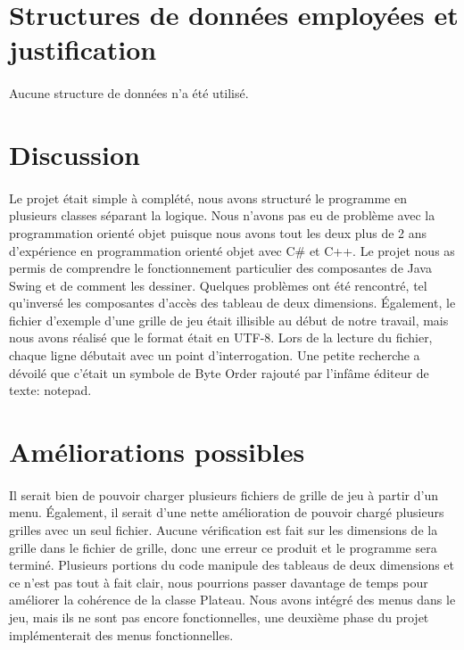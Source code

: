 \documentclass[11pt, french]{article} %
\begin{document}
\section{Structures de données employées et justification}
\paragraph{}
Aucune structure de données n'a été utilisé.


\section{Discussion}
\paragraph{}
Le projet était simple à complété, nous avons structuré le programme en plusieurs classes  séparant la logique. Nous n'avons pas eu de problème avec la programmation orienté objet puisque nous avons tout les deux plus de 2 ans d'expérience en programmation orienté objet avec C\# et C++. Le projet nous as permis de comprendre le fonctionnement particulier des composantes de Java Swing et de comment les dessiner. Quelques problèmes ont été rencontré, tel qu'inversé les composantes d'accès des tableau de deux dimensions. Également, le fichier d'exemple d'une grille de jeu était illisible au début de notre travail, mais nous avons réalisé que le format était en UTF-8. Lors de la lecture du fichier, chaque ligne débutait avec un point d'interrogation. Une petite recherche a dévoilé que c'était un symbole de Byte Order rajouté par l'infâme éditeur de texte: notepad.



\section{Améliorations possibles}
\paragraph{}
Il serait bien de pouvoir charger plusieurs fichiers de grille de jeu à partir d'un menu. Également, il serait d'une nette amélioration de pouvoir chargé plusieurs grilles avec un seul fichier. Aucune vérification est fait sur les dimensions de la grille dans le fichier de grille, donc une erreur ce produit et le programme sera terminé. Plusieurs portions du code manipule des tableaus de deux dimensions et ce n'est pas tout à fait clair, nous pourrions passer davantage de temps pour améliorer la cohérence de la classe Plateau. Nous avons intégré des menus dans le jeu, mais ils ne sont pas encore fonctionnelles, une deuxième phase du projet implémenterait des menus fonctionnelles.
\end{document}
